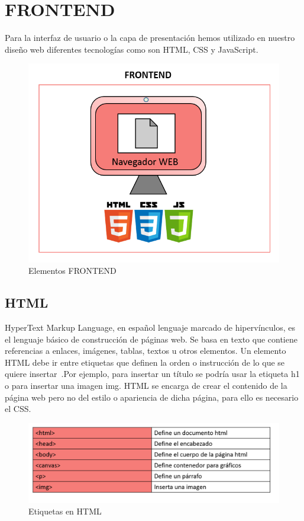 \documentclass[a4paper, 12pt]{book}
\begin{document}
\section{FRONTEND}
Para la interfaz de usuario o la capa de presentación hemos utilizado en nuestro diseño web diferentes tecnologías como son HTML, CSS y JavaScript.
\begin{figure}[h]
        \centering
        \includegraphics[scale=0.4]{img/frontend.png}
        \caption{Elementos FRONTEND}
        \label{figura:frontend}
\end{figure}
\subsection{HTML}
HyperText Markup Language, en español lenguaje marcado de hipervínculos, es el lenguaje básico de construcción de páginas web. Se basa en texto que contiene referencias a enlaces, imágenes, tablas, textos u otros elementos. Un elemento HTML debe ir entre etiquetas que definen la orden o instrucción de lo que se quiere insertar~\cite{equipo2009diseno}.Por ejemplo, para insertar un título se podría usar la etiqueta h1 o para insertar una imagen img. HTML se encarga de crear el contenido de la página web pero no del estilo o apariencia de dicha página, para ello es necesario el CSS. 

\begin{figure}[h]
        \centering
        \includegraphics[scale=0.6]{img/tags.PNG}
        \caption{Etiquetas en HTML}
        \label{figura:tags}
\end{figure}
\end{document}
